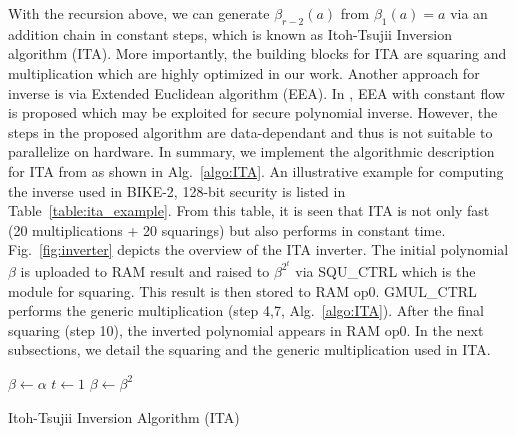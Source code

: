 \documentclass[runningheads]{llncs}
\begin{document}
With the recursion above, we can generate $\beta_{r-2}(a)$ from $\beta_{1}(a)=a$ via an addition chain in constant steps, which is known as Itoh-Tsujii Inversion algorithm (ITA). More importantly, the building blocks for ITA are squaring and multiplication which are highly optimized in our work. Another approach for inverse is via Extended Euclidean algorithm (EEA). In \cite{georgieva2015toward}, EEA with constant flow is proposed which may be exploited for secure polynomial inverse. However, the steps in the proposed algorithm are data-dependant and thus is not suitable to parallelize on hardware. In summary, we implement the algorithmic description for ITA from \cite{hu2015fast} as shown in Alg.~\ref{algo:ITA}. An illustrative example for computing the inverse used in BIKE-2, 128-bit security is listed in Table~\ref{table:ita_example}. From this table, it is seen that ITA is not only fast (20 multiplications + 20 squarings) but also performs in constant time. Fig.~\ref{fig:inverter} depicts the overview of the ITA inverter. The initial polynomial $\beta$ is uploaded to RAM result and raised to ${\beta}^{2^t}$ via SQU\_CTRL which is the module for squaring. This result is then stored to RAM op0. GMUL\_CTRL performs the generic multiplication (step 4,7, Alg.~\ref{algo:ITA}). After the final squaring (step 10), the inverted polynomial appears in RAM op0. In the next subsections, we detail the squaring and the generic multiplication used in ITA.

\begin{algorithm}[!tb]
\DontPrintSemicolon %
$\beta \gets \alpha$ \;
$t \gets 1$ \;
 $\beta \gets \beta ^2$ \;
\Return {$\beta$}


\caption{Itoh-Tsujii Inversion Algorithm (ITA) \cite{hu2015fast}}
\label{algo:ITA}
\end{algorithm}
\end{document}
